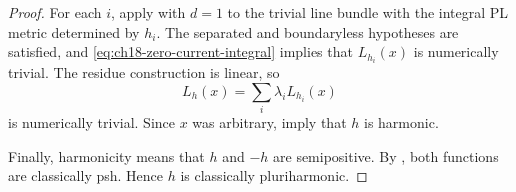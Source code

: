 \begin{proof}
For each $i$, apply \cite[Theorem~18.8.4]{CLD25} with $d=1$ to the trivial
line bundle with the integral PL metric determined by $h_i$.  The separated
and boundaryless hypotheses are satisfied, and
\eqref{eq:ch18-zero-current-integral} implies that $L_{h_i}(x)$ is
numerically trivial.  The residue construction is linear, so
\[
                         L_h(x)=\sum_i\lambda_iL_{h_i}(x)
\]
is numerically trivial.  Since $x$ was arbitrary,
\cite[Proposition~7.1 and Definition~7.2]{GJR26} imply that $h$ is harmonic.

Finally, harmonicity means that $h$ and $-h$ are semipositive.  By
, both functions are classically psh.  Hence $h$
is classically pluriharmonic.
\end{proof}
